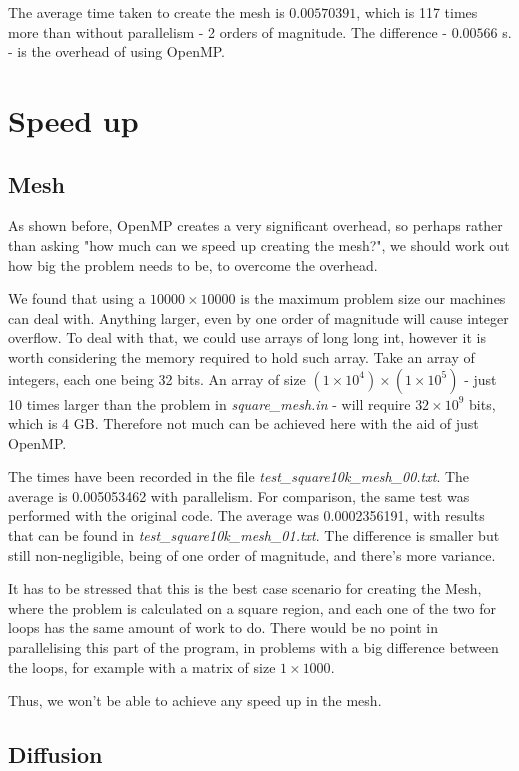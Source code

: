 \documentclass[11pt,journal]{IEEEtran}
\begin{document}
	The average time taken to create the mesh is $0.00570391$, which is 117 times more than without parallelism - 2 orders of magnitude. The difference - $0.00566$ s. - is the overhead of using OpenMP.
	
	
	\section{Speed up}
	
	\subsection{Mesh}
	As shown before, OpenMP creates a very significant overhead, so perhaps rather than asking "how much can we speed up creating the mesh?", we should work out how big the problem needs to be, to overcome the overhead.
	
	We found that using a $10000 \times 10000$ is the maximum problem size our machines can deal with. Anything larger, even by one order of magnitude will cause integer overflow. To deal with that, we could use arrays of long long int, however it is worth considering the memory required to hold such array. Take an array of integers, each one being 32 bits. An array of size $(1 \times 10^4) \times (1 \times 10^5)$ - just 10 times larger than the problem in \emph{square\_mesh.in} - will require $32 \times 10^{9}$ bits, which is 4 GB. Therefore not much can be achieved here with the aid of just OpenMP. 
	
	The times have been recorded in the file \emph{test\_square10k\_mesh\_00.txt}. The average is 0.005053462 with parallelism. For comparison, the same test was performed with the original code. The average was 0.0002356191, with results that can be found in \emph{test\_square10k\_mesh\_01.txt}. The difference is smaller but still non-negligible, being of one order of magnitude, and there's more variance.
	
	It has to be stressed that this is the best case scenario for creating the Mesh, where the problem is calculated on a square region, and each one of the two for loops has the same amount of work to do. There would be no point in parallelising this part of the program, in problems with a big difference between the loops, for example with a matrix of size $1 \times 1000$.
	
	Thus, we won't be able to achieve any speed up in the mesh. 
	
	\subsection{Diffusion}
	
\end{document}
